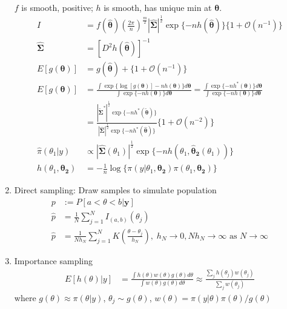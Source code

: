 \documentclass[10pt,landscape]{article}
\begin{document}
\begin{multicols}{3}
\begin{enumerate}
\begin{align*}
  \end{align*}
  $f$ is smooth, positive; $h$ is smooth, has unique min at $\bm{\theta}$.
  \begin{align*}
    \hat{I} & = f(\bm{\hat{\theta}})(\frac{2\pi}{n})^{\frac{m}{2}} |\bm{\hat{\Sigma}}|^{\frac{1}{2}} \exp\{-nh(\bm{\hat{\theta}})\}\{1 + \mathcal{O}(n^{-1})\} \\
    \bm{\hat{\Sigma}} & = [D^2h(\bm{\hat{\theta}})]^{-1} \\
    E[g(\bm{\theta})] & = g(\bm{\hat{\theta}}) + \{1 + \mathcal{O}(n^{-1})\} \\
    E[g(\bm{\theta})] & = \frac{\int\exp\{\log[g(\bm{\theta})] - nh(\bm{\theta})\}d\bm{\theta}}{\int\exp\{-nh(\bm{\theta})\}d\bm{\theta}} = \frac{\int\exp\{-nh^*(\bm{\theta})\}d\bm{\theta}}{\int\exp\{-nh(\bm{\theta})\}d\bm{\theta}} \\
            & = \frac{|\bm{\tilde{\Sigma}}^*|^{\frac{1}{2}} \exp\{-nh^*(\bm{\tilde{\theta}})\}}{|\bm{\hat{\Sigma}}|^{\frac{1}{2}} \exp\{-nh^*(\bm{\hat{\theta}})\}}\{1+\mathcal{O}(n^{-2})\} \\
    \hat{\pi}(\theta_1 | y) & \propto |\bm{\hat{\Sigma}}(\theta_1)|^\frac{1}{2} \exp\{-nh(\theta_1, \bm{\hat{\theta}_2}(\theta_1))\} \\
    h(\theta_1, \bm{\theta_2}) & = -\frac{1}{n}\log\{\pi(y|\theta_1, \bm{\theta_2}) \pi(\theta_1, \bm{\theta_2})\}
  \end{align*}
\item Direct sampling: Draw samples to simulate population
  \begin{align*}
    p & := P[a < \theta < b | \bm{y}] \\
    \hat{p} & = \frac{1}{N} \sum_{j=1}^N I_{(a,b)}(\theta_j) \\
    \hat{p} & = \frac{1}{Nh_N} \sum_{j=1}^N K\left(\frac{\theta-\theta_j}{h_N}\right),\; h_N \to 0, Nh_N \to \infty \text{ as } N \to \infty
  \end{align*}
\item Importance sampling
  \begin{align*}
    E[h(\theta)|y] & = \frac{\int h(\theta) w(\theta) g(\theta) d\theta}{\int w(\theta) g(\theta) d\theta}
                     \approx \frac{\sum_j h(\theta_j)w(\theta_j)}{\sum_j w(\theta_j)}
  \end{align*}
  where $g(\theta) \approx \pi(\theta | y)$, $\theta_j \sim g(\theta)$, $w(\theta) = \pi(y|\theta)\pi(\theta)/g(\theta)$
\end{enumerate}
\end{multicols}
\end{document}
